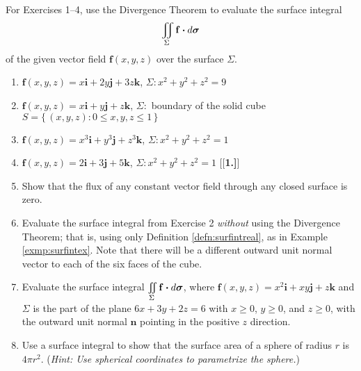 \startexercises\label{sec4dot4}
\par\noindent For Exercises 1--4, use the Divergence Theorem to evaluate the surface integral
\[\iint\limits_{\Sigma} \mathbf{f} \bm{\cdot} d\bm{\sigma}\] of the given vector field $\mathbf{f}(x,y,z)$ over the
surface $\Sigma$.
\begin{enumerate}[\bfseries 1.]
 \item $\mathbf{f}(x,y,z) = x\mathbf{i} + 2y\mathbf{j} + 3z\mathbf{k}$, $\Sigma: x^2 + y^2 + z^2 = 9$
 \item $\mathbf{f}(x,y,z) = x\mathbf{i} + y\mathbf{j} + z\mathbf{k}$, $\Sigma:$ boundary of the solid cube
  $S = \lbrace\, (x,y,z): 0 \le x,y,z \le 1 \,\rbrace$
 \item $\mathbf{f}(x,y,z) = x^3\mathbf{i} + y^3\mathbf{j} + z^3\mathbf{k}$, $\Sigma: x^2 + y^2 + z^2 = 1$
 \item $\mathbf{f}(x,y,z) = 2\mathbf{i} + 3\mathbf{j} + 5\mathbf{k}$, $\Sigma: x^2 + y^2 + z^2 = 1$
[{[\bfseries 1.]}]

\item Show that the flux of any constant vector field through any closed surface is zero.

\item Evaluate the surface integral from Exercise 2 \emph{without} using the Divergence Theorem;
that is, using only Definition \ref{defn:surfintreal}, as in Example \ref{exmp:surfintex}. 
Note that there will be a different outward unit normal vector to each of the six faces of the cube.

\item Evaluate the surface integral $\iint\limits_{\Sigma} \mathbf{f} \bm{\cdot} d\bm{\sigma}$, where
  $\mathbf{f}(x,y,z) = x^2 \mathbf{i} + xy\mathbf{j} + z\mathbf{k}$ and $\Sigma$ is the part of the plane $6x+3y+2z=6$
  with $x \ge 0$, $y \ge 0$, and $z \ge 0$, with the outward unit normal $\mathbf{n}$ pointing in the positive $z$
  direction.

\item Use a surface integral to show that the surface area of a sphere of radius $r$ is $4\pi r^2$. 
(\emph{Hint: Use spherical coordinates to parametrize the sphere.})


\end{enumerate}
